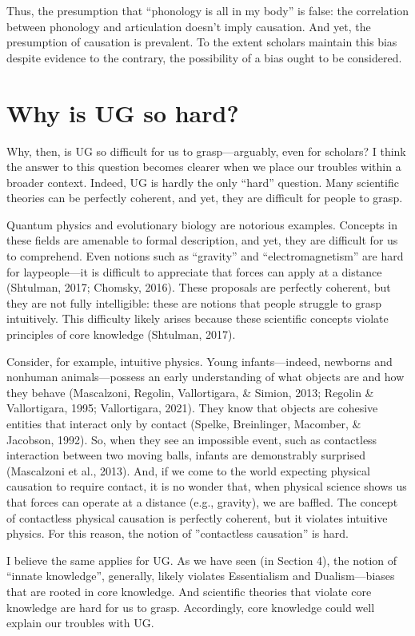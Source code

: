 \documentclass[output=paper,colorlinks,citecolor=brown
]{langscibook}
\begin{document}
Thus, the presumption that “phonology is all in my body” is false: the correlation between phonology and articulation doesn’t imply causation. And yet, the presumption of causation is prevalent. To the extent scholars maintain this bias despite evidence to the contrary, the possibility of a bias ought to be considered. 

\section{Why is UG so hard?}

Why, then, is UG so difficult for us to grasp—arguably, even for scholars? I think the answer to this question becomes clearer when we place our troubles within a broader context. Indeed, UG is hardly the only “hard” question. Many scientific theories can be perfectly coherent, and yet, they are difficult for people to grasp.

Quantum physics and evolutionary biology are notorious examples. Concepts in these fields are amenable to formal description, and yet, they are difficult for us to comprehend. Even notions such as “gravity” and “electromagnetism” are hard for laypeople—it is difficult to appreciate that forces can apply at a distance (Shtulman, 2017; Chomsky, 2016). These proposals are perfectly coherent, but they are not fully intelligible: these are notions that people struggle to grasp intuitively. This difficulty likely arises because these scientific concepts violate principles of core knowledge (Shtulman, 2017). 

Consider, for example, intuitive physics. Young infants—indeed, newborns and nonhuman animals—possess an early understanding of what objects are and how they behave (Mascalzoni, Regolin, Vallortigara, \& Simion, 2013; Regolin \& Vallortigara, 1995; Vallortigara, 2021). They know that objects are cohesive entities that interact only by contact (Spelke, Breinlinger, Macomber, \& Jacobson, 1992). So, when they see an impossible event, such as contactless interaction between two moving balls, infants are demonstrably surprised (Mascalzoni et al., 2013). And, if we come to the world expecting physical causation to require contact, it is no wonder that, when physical science shows us that forces can operate at a distance (e.g., gravity), we are baffled. The concept of contactless physical causation is perfectly coherent, but it violates intuitive physics.  For this reason, the notion of ”contactless causation” is hard. 

I believe the same applies for UG. As we have seen (in Section 4), the notion of “innate knowledge”, generally, likely violates Essentialism and Dualism—biases that are rooted in core knowledge. And scientific theories that violate core knowledge are hard for us to grasp. Accordingly, core knowledge could well explain our troubles with UG.
\end{document}
